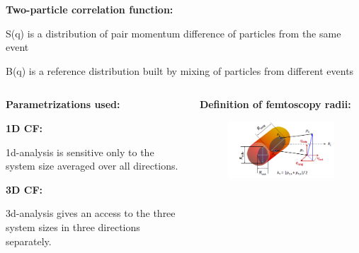 \documentclass[dvipsnames] {beamer}
\begin{document}
\begin{frame}[shrink=40]
\begin{columns}[c]
\begin{block}{{\bf \centering Two-particle correlation function:}}
\begin{center}
{            \alert {S(q)} is a distribution of pair momentum difference of particles from the same event
            
            \alert {B(q)} is a reference distribution built by mixing of particles from different events}
        \end{center}
    \end{block}
  \end{columns}

  \begin{columns}[c]
    \begin{block}{\bf \centering Parametrizations used:}     
     \begin{block}{\bf \centering 1D CF:}

      \small {\alert{1d-analysis}} is sensitive only to the system size averaged over all directions.
    \end{block}
    \begin{block}{\bf \centering 3D CF:}
    
    \small {\alert{3d-analysis}} gives an access to the three system sizes in three directions separately.
    \end{block}
    \end{block}
    \begin{block}{\center \bf Definition of femtoscopy radii:}
    \begin{figure}[H]
      \includegraphics[width=.9\linewidth]{corr_femto4.png}
    \end{figure}
  \end{block}
  \end{columns}
\end{frame}
\end{document}
